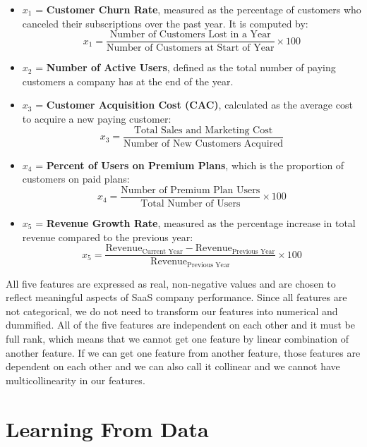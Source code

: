 \documentclass[12pt]{article}
\begin{document}
\begin{itemize}

    \item $x_1$ = \textbf{Customer Churn Rate}, measured as the percentage of customers who canceled their subscriptions over the past year. It is computed by:
    \[
    x_1 = \frac{\text{Number of Customers Lost in a Year}}{\text{Number of Customers at Start of Year}} \times 100
    \]
    
    \item $x_2$ = \textbf{Number of Active Users}, defined as the total number of paying customers a company has at the end of the year.
    
    \item $x_3$ = \textbf{Customer Acquisition Cost (CAC)}, calculated as the average cost to acquire a new paying customer:
    \[
    x_3 = \frac{\text{Total Sales and Marketing Cost}}{\text{Number of New Customers Acquired}}
    \]
    
    \item $x_4$ = \textbf{Percent of Users on Premium Plans}, which is the proportion of customers on paid plans:
    \[
    x_4 = \frac{\text{Number of Premium Plan Users}}{\text{Total Number of Users}} \times 100
    \]
    
    \item $x_5$ = \textbf{Revenue Growth Rate}, measured as the percentage increase in total revenue compared to the previous year:
    \[
    x_5 = \frac{\text{Revenue}_{\text{Current Year}} - \text{Revenue}_{\text{Previous Year}}}{\text{Revenue}_{\text{Previous Year}}} \times 100
    \]
\end{itemize}

All five features are expressed as real, non-negative values and are chosen to reflect meaningful aspects of SaaS company performance. Since all features are not categorical, we do not need to transform our features into numerical and dummified. All of the five features are independent on each other and it must be full rank, which means that we cannot get one feature by linear combination of another feature. If we can get one feature from another feature, those features are dependent on each other and we can also call it collinear and we cannot have multicollinearity in our features.

\section{Learning From Data}
\end{document}
